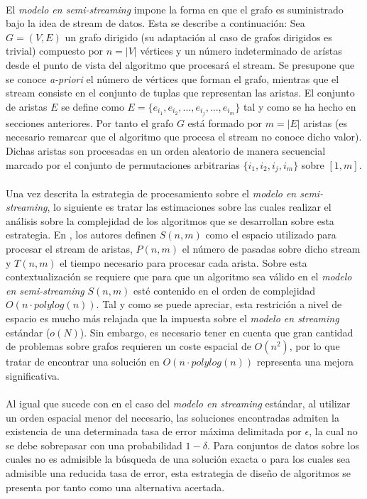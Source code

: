 \documentclass{subfiles}
\begin{document}
      \paragraph{}
      El \emph{modelo en semi-streaming} impone la forma en que el grafo es suministrado bajo la idea de stream de datos. Esta se describe a continuación: Sea $G = (V, E)$ un grafo dirigido (su adaptación al caso de grafos dirigidos es trivial) compuesto por $n = |V|$ vértices y un número indeterminado de arístas desde el punto de vista del algoritmo que procesará el stream. Se presupone que se conoce \emph{a-priori} el número de vértices que forman el grafo, mientras que el stream consiste en el conjunto de tuplas que representan las aristas. El conjunto de aristas $E$ se define como $E = \{ e_{i_1}, e_{i_2}, ..., e_{i_j}, ..., e_{i_m} \}$ tal y como se ha hecho en secciones anteriores. Por tanto el grafo $G$ está formado por $m = |E|$ aristas (es necesario remarcar que el algoritmo que procesa el stream no conoce dicho valor). Dichas aristas son procesadas en un orden aleatorio de manera secuencial marcado por el conjunto de permutaciones arbitrarias $\{ i_1, i_2, i_j, i_m \}$ sobre $[1, m]$.

      \paragraph{}
      Una vez descrita la estrategia de procesamiento sobre el \emph{modelo en semi-streaming}, lo siguiente es tratar las estimaciones sobre las cuales realizar el análisis sobre la complejidad de los algoritmos que se desarrollan sobre esta estrategia. En \cite{feigenbaum2005graph}, los autores definen $S(n,m)$ como el espacio utilizado para procesar el stream de aristas, $P(n,m)$ el número de pasadas sobre dicho stream y $T(n,m)$ el tiempo necesario para procesar cada arista. Sobre esta contextualización se requiere que para que un algoritmo sea válido en el \emph{modelo en semi-streaming} $S(n,m)$ esté contenido en el orden de complejidad $O(n \cdot polylog(n))$. Tal y como se puede apreciar, esta restrición a nivel de espacio es mucho más relajada que la impuesta sobre el \emph{modelo en streaming} estándar ($o(N)$). Sin embargo, es necesario tener en cuenta que gran cantidad de problemas sobre grafos requieren un coste espacial de $O(n^2)$, por lo que tratar de encontrar una solución en $O(n \cdot polylog(n))$ representa una mejora significativa.

      \paragraph{}
      Al igual que sucede con en el caso del \emph{modelo en streaming} estándar, al utilizar un orden espacial menor del necesario, las soluciones encontradas admiten la existencia de una determinada tasa de error máxima delimitada por $\epsilon$, la cual no se debe sobrepasar con una probabilidad $1-\delta$. Para conjuntos de datos sobre los cuales no es admisible la búsqueda de una solución exacta o para los cuales sea admisible una reducida tasa de error, esta estrategia de diseño de algoritmos se presenta por tanto como una alternativa acertada.
\end{document}
